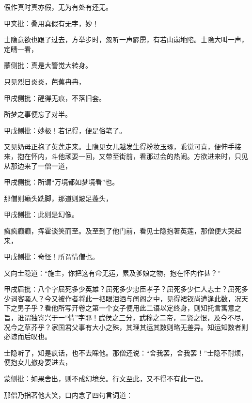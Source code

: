 \begin{poem}

    \begin{pl}

        假作真时真亦假，无为有处有还无。\end{pl}
    \begin{note}甲夹批：叠用真假有无字，妙！\end{note}
\end{poem}

\begin{parag}
    士隐意欲也跟了过去，方举步时，忽听一声霹雳，有若山崩地陷。士隐大叫一声，定睛一看，\begin{note}蒙侧批：真是大警觉大转身。\end{note}只见烈日炎炎，芭蕉冉冉，\begin{note}甲戌侧批：醒得无痕，不落旧套。\end{note}所梦之事便忘了对半。\begin{note}甲戌侧批：妙极！若记得，便是俗笔了。\end{note}
\end{parag}


\begin{parag}
    又见奶母正抱了英莲走来。士隐见女儿越发生得粉妆玉琢，乖觉可喜，便伸手接来，抱在怀内，斗他顽耍一回，又带至街前，看那过会的热闹。方欲进来时，只见从那边来了一僧一道，\begin{note}甲戌侧批：所谓“万境都如梦境看”也。\end{note}那僧则癞头跣脚，那道则跛足蓬头，\begin{note}甲戌侧批：此则是幻像。\end{note}疯疯癫癫，挥霍谈笑而至。及至到了他门前，看见士隐抱著英莲，那僧便大哭起来，\begin{note}甲戌侧批：奇怪！所谓情僧也。\end{note}又向士隐道：“施主，你把这有命无运，累及爹娘之物，抱在怀内作甚？”\begin{note}甲戌眉批：八个字屈死多少英雄？屈死多少忠臣孝子？屈死多少仁人志士？屈死多少词客骚人？今又被作者将此一把眼泪洒与闺阁之中，见得裙钗尚遭逢此数，况天下之男子乎？看他所写开卷之第一个女子便用此二语以定终身，则知托言寓意之旨，谁谓独寄兴于一“情”字耶！武侯之三分，武穆之二帝，二贤之恨，及今不尽，况今之草芥乎？家国君父事有大小之殊，其理其运其数则略无差异。知运知数者则必谅而后叹也。\end{note}士隐听了，知是疯话，也不去睬他。那僧还说：“舍我罢，舍我罢！”士隐不耐烦，便抱女儿撤身要进去，\begin{note}蒙侧批：如果舍出，则不成幻境矣。行文至此，又不得不有此一语。\end{note}那僧乃指著他大笑，口内念了四句言词道：
\end{parag}



